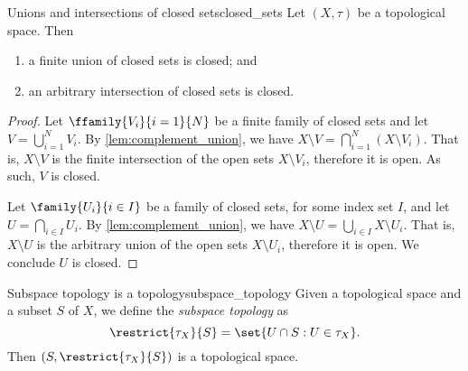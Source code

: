 \begin{proposition}{Unions and intersections of closed sets}{closed_sets}
    Let \((X, \tau)\) be a topological space. Then
    \begin{enumerate}[label=(\alph*)]
        \item a finite union of closed sets is closed; and
        \item an arbitrary intersection of closed sets is closed.
    \end{enumerate}
\end{proposition}
\begin{proof}
    Let \(\ffamily{V_i}{i=1}{N}\) be a finite family of closed sets and let \(V = \bigcup_{i=1}^N V_i\). By \cref{lem:complement_union}, we have \(X \setminus V = \bigcap_{i = 1}^N \left(X \setminus V_i\right).\) That is, \(X \setminus V\) is the finite intersection of the open sets \(X \setminus V_i\), therefore it is open. As such, \(V\) is closed.

    Let \(\family{U_i}{i \in I}\) be a family of closed sets, for some index set \(I\), and let \(U = \bigcap_{i \in I} U_i\). By \cref{lem:complement_union}, we have \(X \setminus U = \bigcup_{i \in I} X \setminus U_i\). That is, \(X \setminus U\) is the arbitrary union of the open sets \(X \setminus U_i\), therefore it is open. We conclude \(U\) is closed.
\end{proof}
\begin{proposition}{Subspace topology is a topology}{subspace_topology}
    Given a topological space  and a subset \(S\) of \(X\), we define the \emph{subspace topology}  as
    \begin{equation*}
        \restrict{\tau_X}{S} = \set{U \cap S : U \in \tau_X}.
    \end{equation*}
    Then \((S, \restrict{\tau_X}{S})\) is a topological space.
\end{proposition}
